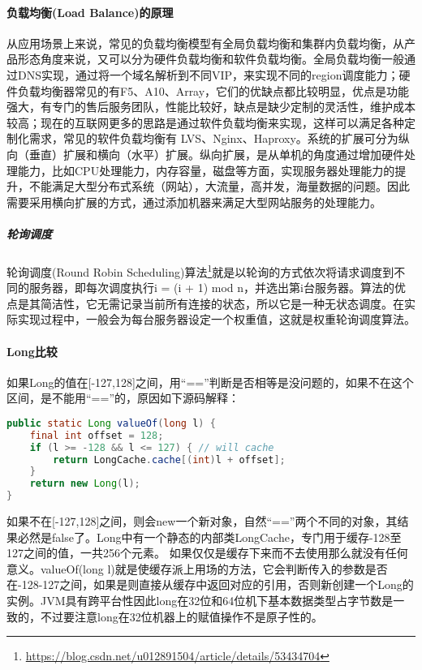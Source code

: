 \documentclass[../../../interview-questions.tex]{subfiles}
\begin{document}
\paragraph{负载均衡(Load Balance)的原理}

从应用场景上来说，常见的负载均衡模型有全局负载均衡和集群内负载均衡，从产品形态角度来说，又可以分为硬件负载均衡和软件负载均衡。全局负载均衡一般通过DNS实现，通过将一个域名解析到不同VIP，来实现不同的region调度能力；硬件负载均衡器常见的有F5、A10、Array，它们的优缺点都比较明显，优点是功能强大，有专门的售后服务团队，性能比较好，缺点是缺少定制的灵活性，维护成本较高；现在的互联网更多的思路是通过软件负载均衡来实现，这样可以满足各种定制化需求，常见的软件负载均衡有 LVS、Nginx、Haproxy。系统的扩展可分为纵向（垂直）扩展和横向（水平）扩展。纵向扩展，是从单机的角度通过增加硬件处理能力，比如CPU处理能力，内存容量，磁盘等方面，实现服务器处理能力的提升，不能满足大型分布式系统（网站），大流量，高并发，海量数据的问题。因此需要采用横向扩展的方式，通过添加机器来满足大型网站服务的处理能力。

\subparagraph{轮询调度}

轮询调度(Round Robin Scheduling)算法\footnote{\url{https://blog.csdn.net/u012891504/article/details/53434704}}就是以轮询的方式依次将请求调度到不同的服务器，即每次调度执行i = (i + 1) mod n，并选出第i台服务器。算法的优点是其简洁性，它无需记录当前所有连接的状态，所以它是一种无状态调度。在实际实现过程中，一般会为每台服务器设定一个权重值，这就是权重轮询调度算法。

\paragraph{Long比较}

如果Long的值在[-127,128]之间，用“==”判断是否相等是没问题的，如果不在这个区间，是不能用“==”的，原因如下源码解释：

\begin{lstlisting}[language=Java]
public static Long valueOf(long l) {
    final int offset = 128;
    if (l >= -128 && l <= 127) { // will cache
        return LongCache.cache[(int)l + offset];
    }
    return new Long(l);
}
\end{lstlisting}

如果不在[-127,128]之间，则会new一个新对象，自然“==”两个不同的对象，其结果必然是false了。Long中有一个静态的内部类LongCache，专门用于缓存-128至127之间的值，一共256个元素。
如果仅仅是缓存下来而不去使用那么就没有任何意义。valueOf(long l)就是使缓存派上用场的方法，它会判断传入的参数是否在-128-127之间，如果是则直接从缓存中返回对应的引用，否则新创建一个Long的实例。JVM具有跨平台性因此long在32位和64位机下基本数据类型占字节数是一致的，不过要注意long在32位机器上的赋值操作不是原子性的。
\end{document}
